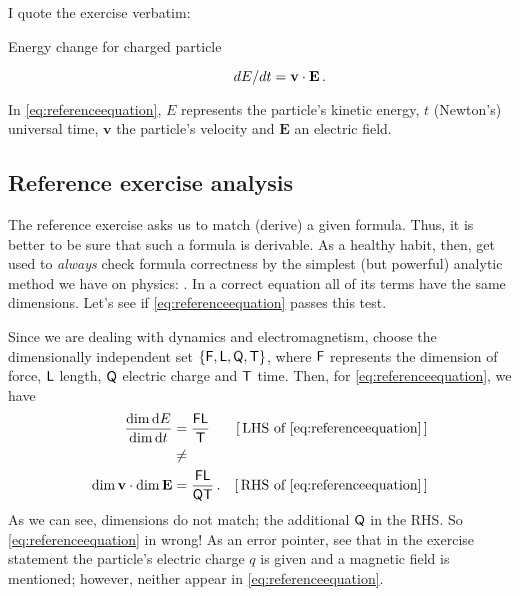 I quote the exercise verbatim:
%
\begin{description}
%
\item[Energy change for charged particle] 
%
\begin{equation}\label{eq:referenceequation}
  dE/dt = \mathbf{v}\cdot\mathbf{E}\,.
\end{equation}
%
\end{description}
%
In \cref{eq:referenceequation}, $E$ represents the particle's kinetic energy, $t$ (Newton's) universal time, $\mathbf{v}$ the particle's velocity and $\mathbf{E}$ an electric field.


\subsection{Reference exercise analysis}\label{sec:referenceanalysis}
%
The reference exercise asks us to match (derive) a given formula. Thus, it is better to be sure that such a formula is derivable. As a healthy habit, then, get used to \emph{always} check formula correctness by the simplest (but powerful) analytic method we have on physics: .
%
%
In a correct equation all of its terms have the same dimensions. Let's see if \cref{eq:referenceequation} passes this test.

Since we are dealing with dynamics and electromagnetism, choose the dimensionally independent set $\lbrace{\mathsf{F}, \mathsf{L}, \mathsf{Q}, \mathsf{T}}\rbrace$, where $\mathsf{F}$ represents the dimension of force, $\mathsf{L}$ length, $\mathsf{Q}$ electric charge and $\mathsf{T}$ time. Then, for \cref{eq:referenceequation}, we have
%
\begin{align*}
%
  \dfrac{\dim\dx E}{\dim\dx t} &= \dfrac{\phdim{FL}}{\phdim{T}} & \eqtxt{LHS of \cref{eq:referenceequation}} \\
  &\not= & \\
  \dim{\mathbf{v}}\iprod\dim{\mathbf{E}} &= \dfrac{\phdim{FL}}{\phdim{QT}}\,. & \eqtxt{RHS of \cref{eq:referenceequation}}
%
\end{align*}
%
As we can see, dimensions do not match; \viz the additional $\mathsf{Q}$ in the RHS. So \cref{eq:referenceequation} in wrong! As an error pointer, see that in the exercise statement the particle's electric charge $q$ is given and a magnetic field is mentioned; however, neither appear in \cref{eq:referenceequation}.


